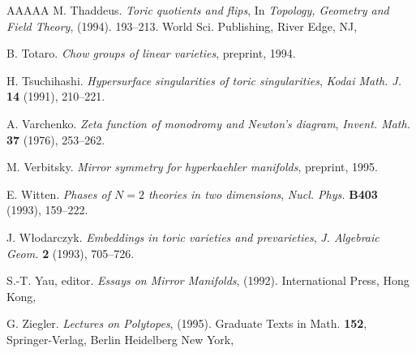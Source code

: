 \documentclass{amsart}
\theoremstyle{plain}
\theoremstyle{definition}
\begin{document}
\begin{thebibliography}{AAAAA}
M. Thaddeus. \textit{Toric quotients and flips}, In \textit{Topology, Geometry and Field Theory}, (1994). 193--213. World Sci. Publishing, River Edge, NJ,

B. Totaro. \textit{Chow groups of linear varieties}, preprint, 1994.

H. Tsuchihashi. \textit{Hypersurface singularities of toric singularities}, \textit{Kodai Math. J.} \textbf{14} (1991), 210--221.

A. Varchenko. \textit{Zeta function of monodromy and Newton's diagram}, \textit{Invent. Math.} \textbf{37} (1976), 253--262.

M. Verbitsky. \textit{Mirror symmetry for hyperkaehler manifolds}, preprint, 1995.

E. Witten. \textit{Phases of $N=2$ theories in two dimensions}, \textit{Nucl. Phys.} \textbf{B403} (1993), 159--222.

J. W\l odarczyk. \textit{Embeddings in toric varieties and prevarieties}, \textit{J. Algebraic Geom.} \textbf{2} (1993), 705--726.

S.-T. Yau, editor. \textit{Essays on Mirror Manifolds}, (1992). International Press, Hong Kong,

G. Ziegler. \textit{Lectures on Polytopes}, (1995). Graduate Texts in Math. \textbf{152}, Springer-Verlag, Berlin Heidelberg New York,

\end{thebibliography}
\end{document}
